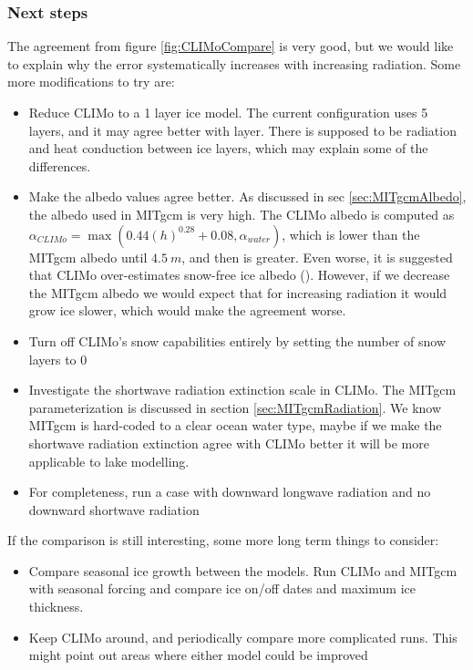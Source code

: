 \documentclass[11pt]{article}
\begin{document}
\subsubsection{Next steps}
The agreement from figure \ref{fig:CLIMoCompare} is very good, but we would like to explain why the error systematically increases with increasing radiation. Some more modifications to try are:
\begin{itemize}
\item{Reduce CLIMo to a 1 layer ice model. The current configuration uses 5 layers, and it may agree better with  layer. There is supposed to be radiation and heat conduction between ice layers, which may explain some of the differences.}
\item{Make the albedo values agree better. As discussed in sec \ref{sec:MITgcmAlbedo}, the albedo used in MITgcm is very high. The CLIMo albedo is computed as $\alpha_{CLIMo} = \max(0.44 \left(h\right)^{0.28} + 0.08, \alpha_{water})$, which is lower than the MITgcm albedo until $\SI{4.5}{m}$, and then is greater. Even worse, it is suggested that CLIMo over-estimates snow-free ice albedo (\cite{Svacina2014}). However, if we decrease the MITgcm albedo we would expect that for increasing radiation it would grow ice slower, which would make the agreement worse.}
\item{Turn off CLIMo's snow capabilities entirely by setting the number of snow layers to 0}
\item{Investigate the shortwave radiation extinction scale in CLIMo. The MITgcm parameterization is discussed in section \ref{sec:MITgcmRadiation}. We know MITgcm is hard-coded to a clear ocean water type, maybe if we make the shortwave radiation extinction agree with CLIMo better it will be more applicable to lake modelling.}
\item{For completeness, run a case with downward longwave radiation and no downward shortwave radiation}
\end{itemize}
If the comparison is still interesting, some more long term things to consider:
\begin{itemize}
\item{Compare seasonal ice growth between the models. Run CLIMo and MITgcm with seasonal forcing and compare ice on/off dates and maximum ice thickness.}
\item{Keep CLIMo around, and periodically compare more complicated runs. This might point out areas where either model could be improved}
\end{itemize}
\end{document}

